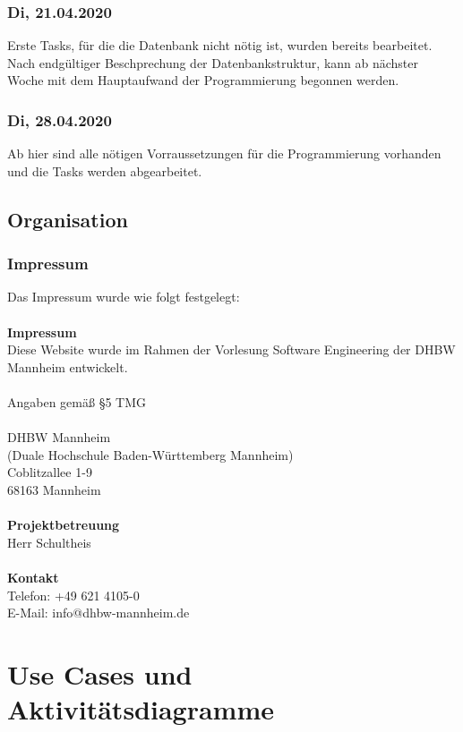 \subsection{Di, 21.04.2020}
Erste Tasks, für die die Datenbank nicht nötig ist, wurden bereits bearbeitet.
Nach endgültiger Beschprechung der Datenbankstruktur, kann ab nächster Woche mit dem Hauptaufwand der Programmierung begonnen werden.
\subsection{Di, 28.04.2020}
Ab hier sind alle nötigen Vorraussetzungen für die Programmierung vorhanden und die Tasks werden abgearbeitet.
\newpage
\section{Organisation}
\subsection{Impressum}
Das Impressum wurde wie folgt festgelegt:\\\\
\textbf{Impressum}\\
Diese Website wurde im Rahmen der Vorlesung Software Engineering der DHBW Mannheim entwickelt.\\\\
Angaben gemäß §5 TMG\\\\
DHBW Mannheim\\
(Duale Hochschule Baden-Württemberg Mannheim)\\
Coblitzallee 1-9\\
68163 Mannheim\\\\
\textbf{Projektbetreuung}\\
Herr Schultheis\\\\
\textbf{Kontakt}\\
Telefon: +49 621 4105-0\\
E-Mail: info@dhbw-mannheim.de

\chapter{Use Cases und Aktivitätsdiagramme}
